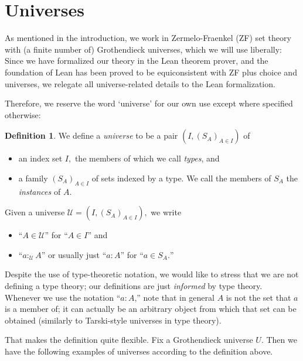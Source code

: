 \documentclass[a4paper]{article}
\theoremstyle{definition}
\newtheorem{definition}{Definition}[section]
\theoremstyle{remark}
\newcommand{\defn}{\emph}
\newcommand{\U}{\mathcal{U}}
\begin{document}
\section{Universes}
\label{sec:universes}

As mentioned in the introduction, we work in Zermelo-Fraenkel (ZF) set theory with (a finite number of)
Grothendieck universes, which we will use liberally: Since we have formalized our theory in the Lean theorem
prover, and the foundation of Lean has been proved to be equiconsistent with ZF plus choice and
universes\cite{Lean-ZFC}, we relegate all universe-related details to the Lean formalization.

Therefore, we reserve the word `universe' for our own use except where specified otherwise:

\begin{definition}
  We define a \defn{universe} to be a pair $(I, (S_A)_{A \in I})$ of
  \begin{itemize}
    \item an index set $I,$ the members of which we call \defn{types}, and
    \item a family $(S_A)_{A \in I}$ of sets indexed by a type. We call the members of $S_A$ the
    \defn{instances} of $A.$
  \end{itemize}
\end{definition}

Given a universe $\U = (I, (S_A)_{A \in I}),$ we write
\begin{itemize}
  \item ``$A \in \U$'' for ``$A \in I$'' and
  \item ``$a :_\U A$'' or usually just ``$a : A$'' for ``$a \in S_A.$''
\end{itemize}

Despite the use of type-theoretic notation, we would like to stress that we are not defining a type
theory; our definitions are just \emph{informed} by type theory. Whenever we use the notation ``$a : A$,''
note that in general $A$ is not the set that $a$ is a member of; it can actually be an arbitrary object
from which that set can be obtained (similarly to Tarski-style universes in type theory\cite{Tarski}).

That makes the definition quite flexible. Fix a Grothendieck universe $U.$ Then we have the following
examples of universes according to the definition above.
\end{document}
